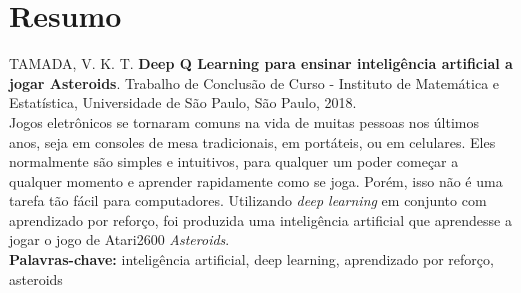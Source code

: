 \chapter*{Resumo}
%
\noindent%
TAMADA, V. K. T. \textbf{Deep Q Learning para ensinar inteligência artificial a jogar Asteroids}. Trabalho de Conclusão de Curso
 - Instituto de Matemática e Estatística, Universidade de São Paulo,
São Paulo, 2018.
\\

Jogos eletrônicos se tornaram comuns na vida de muitas pessoas nos últimos anos, seja em consoles de mesa tradicionais, em portáteis, ou em celulares.
Eles normalmente são simples e intuitivos, para qualquer um poder começar a qualquer momento e aprender rapidamente como se joga.
Porém, isso não é uma tarefa tão fácil para computadores.
Utilizando \textit{deep learning} em conjunto com aprendizado por reforço, foi produzida uma inteligência artificial que aprendesse a jogar o jogo de Atari2600 \textit{Asteroids}.
\\

\noindent%
\textbf{Palavras-chave:} inteligência artificial, deep learning, aprendizado por reforço, asteroids

%
%
